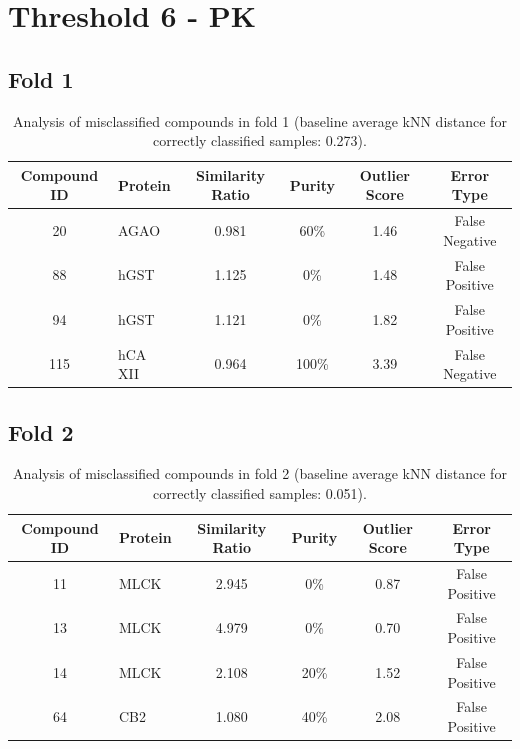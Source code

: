 \documentclass{article}
\newenvironment{smarttabular}[1]{%
    \begin{tabular}{#1}%
}{%
    \end{tabular}%
}
\begin{document}
\clearpage

\section{Threshold 6 - PK}

\subsection{Fold 1}

\begin{table}[H]
    \centering
    \small
    \caption{Analysis of misclassified compounds in fold 1 (baseline average kNN distance for correctly classified samples: 0.273).}
    \label{tab:misclassified_compounds_1}
    \begin{smarttabular}{clcccc}
        \toprule
        \textbf{Compound ID} & \textbf{Protein} & \textbf{Similarity Ratio} & \textbf{Purity} & \textbf{Outlier Score} & \textbf{Error Type} \\
        \midrule
        20 & AGAO & 0.981 & 60\% & 1.46 & False Negative \\
        88 & hGST & 1.125 & 0\% & 1.48 & False Positive \\
        94 & hGST & 1.121 & 0\% & 1.82 & False Positive \\
        115 & hCA XII & 0.964 & 100\% & 3.39 & False Negative \\
        \bottomrule
    \end{smarttabular}
\end{table}

\clearpage

\subsection{Fold 2}

\begin{table}[H]
    \centering
    \small
    \caption{Analysis of misclassified compounds in fold 2 (baseline average kNN distance for correctly classified samples: 0.051).}
    \label{tab:misclassified_compounds_2}
    \begin{smarttabular}{clcccc}
        \toprule
        \textbf{Compound ID} & \textbf{Protein} & \textbf{Similarity Ratio} & \textbf{Purity} & \textbf{Outlier Score} & \textbf{Error Type} \\
        \midrule
        11 & MLCK & 2.945 & 0\% & 0.87 & False Positive \\
        13 & MLCK & 4.979 & 0\% & 0.70 & False Positive \\
        14 & MLCK & 2.108 & 20\% & 1.52 & False Positive \\
        64 & CB2 & 1.080 & 40\% & 2.08 & False Positive \\
        \bottomrule
    \end{smarttabular}
\end{table}
\end{document}
